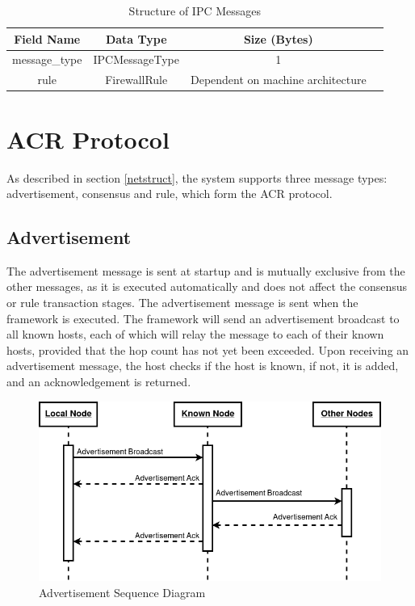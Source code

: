 \documentclass[a4paper, 11pt]{report}
\begin{document}
\begin{table}[H]
\centering
\begin{tabular}{ |c|c|c|c| } 
\hline
Field Name & Data Type & Size (Bytes) \\
\hline
message_type & IPCMessageType & 1 \\
rule & FirewallRule & Dependent on machine architecture \\
\hline
\end{tabular}
\caption{Structure of \acrshort{IPC} Messages}
\label{tab:ipc}
\end{table}
 
\section{ACR Protocol}
As described in section \ref{netstruct}, the system supports three message types: advertisement, consensus and rule, which form the ACR protocol.

\subsection{Advertisement}
The advertisement message is sent at startup and is mutually exclusive from the other messages, as it is executed automatically and does not affect the consensus or rule transaction stages. The advertisement message is sent when the framework is executed. The framework will send an advertisement broadcast to all known hosts, each of which will relay the message to each of their known hosts, provided that the hop count has not yet been exceeded. Upon receiving an advertisement message, the host checks if the host is known, if not, it is added, and an acknowledgement is returned.

\begin{figure}[H]
\centering
\includegraphics[width=\textwidth,keepaspectratio]{advertisement_seq}
\caption{Advertisement Sequence Diagram} 
\label{fig:advseq}
\end{figure}
\end{document}
